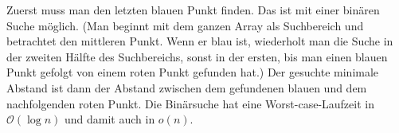 \documentclass{lehramt-informatik-aufgabe}
\begin{document}
\begin{enumerate}
\begin{liAntwort}
Zuerst muss man den letzten blauen Punkt finden. Das ist mit einer
binären Suche möglich. (Man beginnt mit dem ganzen Array als Suchbereich
und betrachtet den mittleren Punkt. Wenn er blau ist, wiederholt man die
Suche in der zweiten Hälfte des Suchbereichs, sonst in der ersten, bis
man einen blauen Punkt gefolgt von einem roten Punkt gefunden hat.) Der
gesuchte minimale Abstand ist dann der Abstand zwischen dem gefundenen
blauen und dem nachfolgenden roten Punkt. Die Binärsuche hat eine
Worst-case-Laufzeit in $\mathcal{O}(\log n)$ und damit auch in $o(n)$.
\end{liAntwort}
\end{enumerate}

\end{document}
